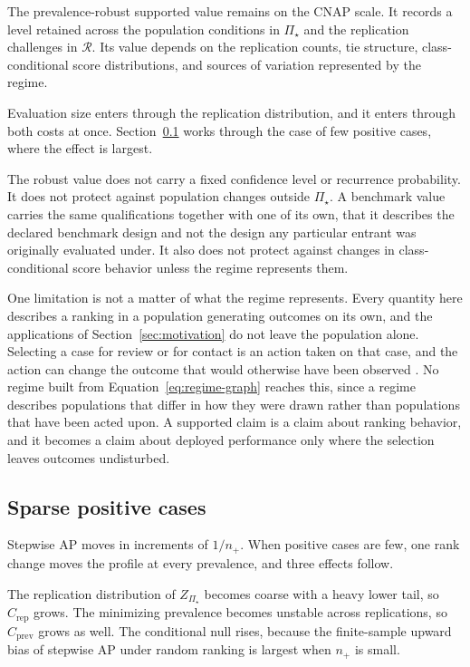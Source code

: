\documentclass[11pt]{article}
\newcommand{\Regime}{\mathcal{R}}
\newcommand{\PSet}{\Pi_\star}
\theoremstyle{remark}
\begin{document}
The prevalence-robust supported value remains on the CNAP scale. It records a level retained across the population conditions in $\PSet$ and the replication challenges in $\Regime$. Its value depends on the replication counts, tie structure, class-conditional score distributions, and sources of variation represented by the regime.

Evaluation size enters through the replication distribution, and it enters through both costs at once. Section~\ref{sec:sparse} works through the case of few positive cases, where the effect is largest.

The robust value does not carry a fixed confidence level or recurrence probability. It does not protect against population changes outside $\PSet$. A benchmark value carries the same qualifications together with one of its own, that it describes the declared benchmark design and not the design any particular entrant was originally evaluated under. It also does not protect against changes in class-conditional score behavior unless the regime represents them.

One limitation is not a matter of what the regime represents. Every quantity here describes a ranking in a population generating outcomes on its own, and the applications of Section~\ref{sec:motivation} do not leave the population alone. Selecting a case for review or for contact is an action taken on that case, and the action can change the outcome that would otherwise have been observed \cite{perdomo2020performative}. No regime built from Equation~\eqref{eq:regime-graph} reaches this, since a regime describes populations that differ in how they were drawn rather than populations that have been acted upon. A supported claim is a claim about ranking behavior, and it becomes a claim about deployed performance only where the selection leaves outcomes undisturbed.

\subsection{Sparse positive cases}
\label{sec:sparse}

Stepwise AP moves in increments of $1/n_+$. When positive cases are few, one rank change moves the profile at every prevalence, and three effects follow.

The replication distribution of $Z_{\PSet}$ becomes coarse with a heavy lower tail, so $C_{\mathrm{rep}}$ grows. The minimizing prevalence becomes unstable across replications, so $C_{\mathrm{prev}}$ grows as well. The conditional null rises, because the finite-sample upward bias of stepwise AP under random ranking is largest when $n_+$ is small.
\end{document}
